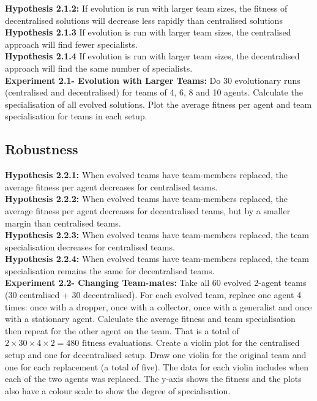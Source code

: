 \documentclass[12pt]{article}
\begin{document}
\textbf{Hypothesis 2.1.2:} If evolution is run with larger team sizes, the fitness of decentralised solutions will decrease less rapidly than centralised solutions\\

\textbf{Hypothesis 2.1.3} If evolution is run with larger team sizes, the centralised approach will find fewer specialists.\\

\textbf{Hypothesis 2.1.4} If evolution is run with larger team sizes, the decentralised approach will find the same number of specialists.\\

\textbf{Experiment 2.1- Evolution with Larger Teams:} Do 30 evolutionary runs (centralised and decentralised) for teams of 4, 6, 8 and 10 agents.
Calculate the specialisation of all evolved solutions.
Plot the average fitness per agent and team specialisation for teams in each setup. \\

\subsection{Robustness}

\textbf{Hypothesis 2.2.1:} When evolved teams have team-members replaced, the average fitness per agent decreases for centralised teams.\\

\textbf{Hypothesis 2.2.2:} When evolved teams have team-members replaced, the average fitness per agent decreases for decentralised teams, but by a smaller margin than centralised teams.\\

\textbf{Hypothesis 2.2.3:} When evolved teams have team-members replaced, the team specialisation decreases for centralised teams.\\

\textbf{Hypothesis 2.2.4:} When evolved teams have team-members replaced, the team specialisation remains the same for decentralised teams.\\

\textbf{Experiment 2.2- Changing Team-mates:} Take all 60 evolved 2-agent teams (30 centralised + 30 decentralised).
For each evolved team, replace one agent 4 times: once with a dropper, once with a collector, once with a generalist and once with a stationary agent.
Calculate the average fitness and team specialisation then repeat for the other agent on the team.
That is a total of $2 \times 30 \times 4 \times 2= 480 \mbox{ fitness evaluations}$. 
Create a violin plot for the centralised setup and one for decentralised setup.
Draw one violin for the original team and one for each replacement (a total of five).
The data for each violin includes when each of the two agents was replaced.
The y-axis shows the fitness and the plots also have a colour scale to show the degree of specialisation.\\
\end{document}
